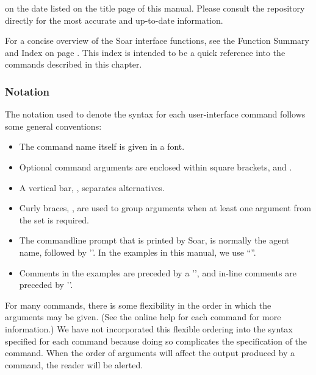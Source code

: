 \hspace{2em}


on the date listed on the title page of this manual.  Please consult
the repository directly for the most accurate and up-to-date information.

For a concise overview of the Soar interface functions, see the Function
Summary and Index on page \pageref{func-sum}. This index is intended to be a
quick reference into the commands described in this chapter.

\subsubsection*{Notation}


The notation used to denote the syntax for each user-interface command follows
some general conventions:\vspace{-12pt}
\begin{itemize}
\item The command name itself is given in a  font.\vspace{-8pt}
\item Optional command arguments are enclosed within square brackets,
	\soar{[} and \soar{]}.\vspace{-8pt}
\item A vertical bar, \soar{|}, separates alternatives.\vspace{-8pt}
\item Curly braces, \soar{\{\}}, are used to group arguments when at least
one argument from the set is required.
\item The commandline prompt that is printed by Soar, is normally
the agent name, followed by '\soar{>}'.  In the examples in this manual, 
we use ``''.
\item Comments in the examples are preceded by
a '\soar{\#}', and in-line comments are preceded by '\soar{;\#}'.
\end{itemize}

For many commands, there is some flexibility in the order in which the
arguments may be given. (See the online help for each command for more
information.)  We have not incorporated this flexible ordering into the syntax
specified for each command because doing so complicates the specification of
the command.  When the order of arguments will affect the output
produced by a command, the reader will be alerted.

